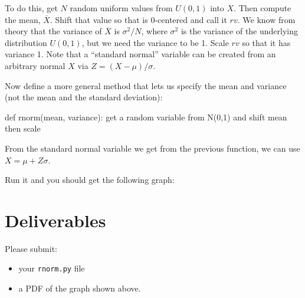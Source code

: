 \begin{fullwidth}
To do this, get $N$ random uniform values from $U(0,1)$ into $X$. Then compute the mean, $\overline X$. Shift that value so that is 0-centered and call it $rv$. We know from theory that the variance of $\overline X$ is $\sigma^2 / N$, where $\sigma^2$ is the variance of the underlying distribution $U(0,1)$, but we need the variance to be 1. Scale $rv$ so that it has variance 1. Note that a ``standard normal'' variable can be created from an arbitrary normal $X$ via $Z = (X-\mu)/\sigma$.

\step Now define a more general method that lets us specify the mean and variance (not the mean and the standard deviation):

\begin{pyverbatim}
def rnorm(mean, variance):
    get a random variable from N(0,1) and shift mean then scale
\end{pyverbatim}	

From the standard normal variable we get from the previous function, we can use $X = \mu+ Z\sigma$.

\step Run it and you should get the following graph:


\section{Deliverables}

Please submit:

\begin{itemize}
\item your {\tt rnorm.py} file
\item a PDF of the graph shown above.
\end{itemize}

\end{fullwidth}

